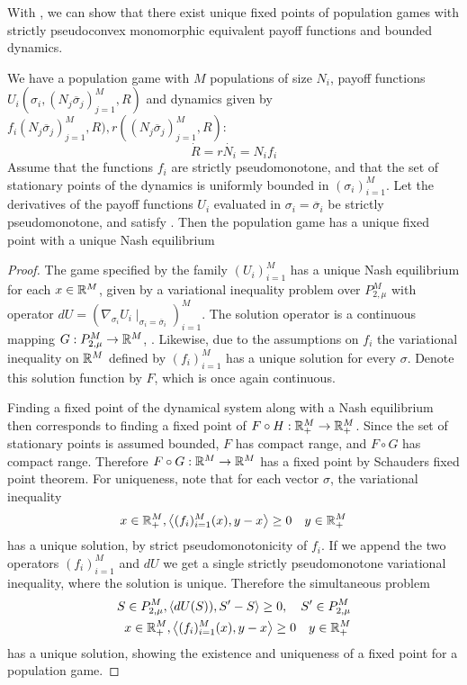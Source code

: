 With , we can show that there exist unique fixed points of population games with strictly pseudoconvex monomorphic equivalent payoff functions and bounded dynamics.
\begin{theorem}
  \label{thm:pop_game_exists_unique}
  We have a population game with $M$ populations of size $N_i$, payoff functions $U_i(\sigma_i, (N_j \overbar{\sigma}_j)_{j=1}^M, R)$ and dynamics given by $f_i(N_j \overbar{\sigma}_j)_{j=1}^M, R),r((N_j \overbar{\sigma}_j)_{j=1}^M, R)$:
  \begin{equation}
    \dot{R} = r
    \dot{N_i} = N_i f_i
  \end{equation}
  Assume that the functions $f_i$ are strictly pseudomonotone, and that the set of stationary points of the dynamics is uniformly bounded in $(\sigma_i)_{i=1}^M$. Let the derivatives of the payoff functions $U_i$ evaluated in $\sigma_i = \overbar{\sigma}_i$ be strictly pseudomonotone, and satisfy . Then the population game has a unique fixed point with a unique Nash equilibrium
\end{theorem}
\begin{proof}
  The game specified by the family $(U_i)_{i=1}^M$ has a unique Nash equilibrium for each $x\in \mathbb{R}^M$, given by a variational inequality problem over $P_{2,\mu}^M$ with operator $dU = (\nabla_{\sigma_i} U_i \mid_{\sigma_i = \overbar{\sigma}_i})_{i=1}^M$. The solution operator is a continuous mapping $G: P_{2,\mu}^M \to \mathbb{R}^M$, \cite[Theorem 4.2]{barbagallo2009continuity}. Likewise, due to the assumptions on $f_i$ the variational inequality on $\mathbb{R}^M$ defined by $(f_i)_{i=1}^M$ has a unique solution for every $\sigma$. Denote this solution function by $F$, which is once again continuous.

  Finding a fixed point of the dynamical system along with a Nash equilibrium then corresponds to finding a fixed point of $F\circ H: \mathbb{R}_+^M \to \mathbb{R}_+^M$. Since the set of stationary points is assumed bounded, $F$ has compact range, and $F\circ G$ has compact range. Therefore $F\circ G:\mathbb{R}^M \to \mathbb{R}^M$ has a fixed point by Schauders fixed point theorem.
  For uniqueness, note that for each vector $\sigma$, the variational inequality
  \begin{equation}
    x \in \mathbb{R}_+^M, \left \langle (f_i)_{i=1}^M(x),y-x \right \rangle\geq 0 \quad y\in \mathbb{R}_+^M
  \end{equation}
  has a unique solution, by strict pseudomonotonicity of $f_i$. If we append the two operators $(f_i)_{i=1}^M$ and $dU$ we get a single strictly pseudomonotone variational inequality, where the solution is unique.
   Therefore the simultaneous problem
  \begin{equation}
    \begin{split}
    S\in P_{2,\mu}^M, \left \langle dU(S)),S'-S \right \rangle \geq 0, \quad S' \in P_{2,\mu}^M \\
    x \in \mathbb{R}_+^M, \left \langle (f_i)_{i=1}^M(x),y-x \right \rangle\geq 0 \quad y\in \mathbb{R}_+^M
  \end{split}
  \end{equation}
    has a unique solution, showing the existence and uniqueness of a fixed point for a population game.
\end{proof}

